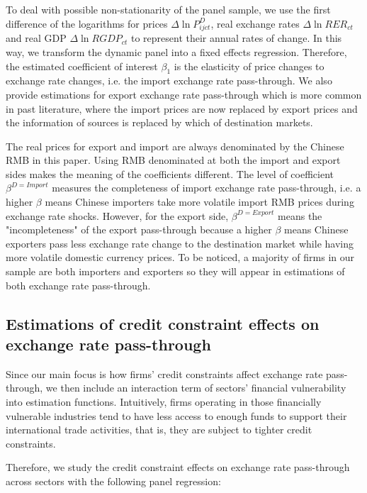 To deal with possible non-stationarity of the panel sample, we use the first difference of the logarithms for prices $\Delta \ln P^{D}_{i j c t}$, real exchange rates $\Delta \ln R E R_{c t}$ and real GDP $\Delta \ln R G D P_{c t}$ to represent their annual rates of change. In this way, we transform the dynamic panel into a fixed effects regression. Therefore, the estimated coefficient of interest $\beta_1$ is the elasticity of price changes to exchange rate changes, i.e. the import exchange rate pass-through. We also provide estimations for export exchange rate pass-through which is more common in past literature, where the import prices are now replaced by export prices and the information of sources is replaced by which of destination markets. 

The real prices for export and import are always denominated by the Chinese RMB in this paper. Using RMB denominated at both the import and export sides makes the meaning of the coefficients different. The level of coefficient $\beta^{D=Import}$ measures the completeness of import exchange rate pass-through, i.e. a higher $\beta$ means Chinese importers take more volatile import RMB prices during exchange rate shocks. However, for the export side,  $\beta^{D=Export}$ means the "incompleteness" of the export pass-through because a higher $\beta$ means Chinese exporters pass less exchange rate change to the destination market while having more volatile domestic currency prices. To be noticed, a majority of firms in our sample are both importers and exporters so they will appear in estimations of both exchange rate pass-through.

\subsection{Estimations of credit constraint effects on exchange rate pass-through}\label{seq-4.1.2}

Since our main focus is how firms' credit constraints affect exchange rate pass-through, we then include an interaction term of sectors’ financial vulnerability into estimation functions. Intuitively, firms operating in those financially vulnerable industries tend to have less access to enough funds to support their international trade activities, that is, they are subject to tighter credit constraints.

Therefore, we study the credit constraint effects on exchange rate pass-through across sectors with the following panel regression:


